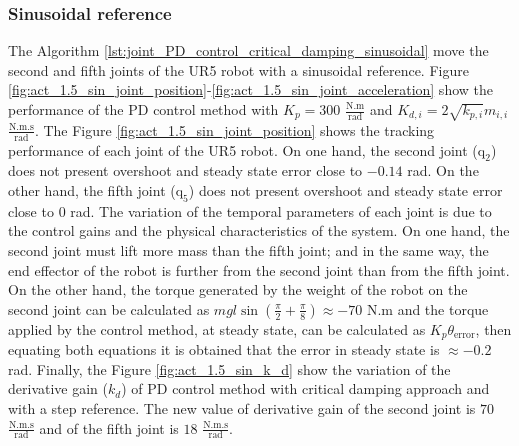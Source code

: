 \subsubsection{Sinusoidal reference}
The Algorithm \ref{lst:joint_PD_control_critical_damping_sinusoidal} move the second and fifth joints of the UR5 robot with a sinusoidal reference. Figure \ref{fig:act_1.5_sin_joint_position}-\ref{fig:act_1.5_sin_joint_acceleration} show the performance of the PD control method with $K_p=300$ $\mathrm{\frac{N.m}{rad}}$ and $K_{d,i}=2 \sqrt{k_{p,i}} m_{i,i}$ $\mathrm{\frac{N.m.s}{rad}}$. The Figure \ref{fig:act_1.5_sin_joint_position} shows the tracking performance of each joint of the UR5 robot. On one hand, the second joint ($\mathrm{q}_2$) does not present overshoot and steady state error close to $-0.14$ rad. On the other hand, the fifth joint ($\mathrm{q}_5$) does not present overshoot and steady state error close to $0$ rad. The variation of the temporal parameters of each joint is due to the control gains and the physical characteristics of the system. On one hand, the second joint must lift more mass than the fifth joint; and in the same way, the end effector of the robot is further from the second joint than from the fifth joint. On the other hand, the torque generated by the weight of the robot on the second joint can be calculated as $m g l \sin({\frac{\pi}{2} + \frac{\pi}{8}}) \approx -70$ N.m and the torque applied by the control method, at steady state, can be calculated as $K_p \theta_{\mathrm{error}}$, then equating both equations it is obtained that the error in steady state is $\approx -0.2$ rad. Finally, the Figure \ref{fig:act_1.5_sin_k_d} show the variation of the derivative gain ($k_d$) of PD control method with critical damping approach and with a step reference. The new value of derivative gain of the second joint is $70$ $\mathrm{\frac{N.m.s}{rad}}$ and of the fifth joint is $18$ $\mathrm{\frac{N.m.s}{rad}}$.  

